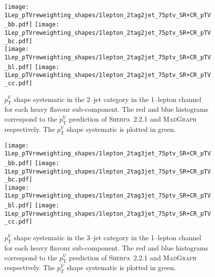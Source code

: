 \begin{figure}[ht!]
  \centering
  \texttt{[image: 1Lep\_pTVreweighting\_shapes/1lepton\_2tag2jet\_75ptv\_SR+CR\_pTV\_bb.pdf]}
  \texttt{[image: 1Lep\_pTVreweighting\_shapes/1lepton\_2tag2jet\_75ptv\_SR+CR\_pTV\_bc.pdf]}
  \\
  \texttt{[image: 1Lep\_pTVreweighting\_shapes/1lepton\_2tag2jet\_75ptv\_SR+CR\_pTV\_bl.pdf]}
  \texttt{[image: 1Lep\_pTVreweighting\_shapes/1lepton\_2tag2jet\_75ptv\_SR+CR\_pTV\_cc.pdf]}
  \\
  \caption[Derivation of $p_{\mathrm{T}}^V$ shape uncertainties on $W+$jets events in the
  1--lepton channel (2--jet category).]{$p_{\mathrm{T}}^V$ shape systematic in the 2--jet
    category in the 1--lepton channel for each heavy flavour sub-component. The
    red and blue histograms correspond to the $p_{\mathrm{T}}^V$ prediction of
    \textsc{Sherpa}~2.2.1 and \textsc{MadGraph} respectively. The $p_{\mathrm{T}}^V$ shape
    systematic is plotted in green.}
  \label{fig:wjets_1lep_2jet_SysWPtVBDTr}
\end{figure}

\begin{figure}[ht!]
  \centering
  \texttt{[image: 1Lep\_pTVreweighting\_shapes/1lepton\_2tag3jet\_75ptv\_SR+CR\_pTV\_bb.pdf]}
  \texttt{[image: 1Lep\_pTVreweighting\_shapes/1lepton\_2tag3jet\_75ptv\_SR+CR\_pTV\_bc.pdf]}
  \\
  \texttt{[image: 1Lep\_pTVreweighting\_shapes/1lepton\_2tag3jet\_75ptv\_SR+CR\_pTV\_bl.pdf]}
  \texttt{[image: 1Lep\_pTVreweighting\_shapes/1lepton\_2tag3jet\_75ptv\_SR+CR\_pTV\_cc.pdf]}
  \\
  \caption[Derivation of $p_{\mathrm{T}}^V$ shape uncertainties on $W+$jets events in the
  1--lepton channel (3--jet category).]{$p_{\mathrm{T}}^V$ shape systematic in the 3--jet
    category in the 1--lepton channel for each heavy flavour sub-component. The
    red and blue histograms correspond to the $p_{\mathrm{T}}^V$ prediction of
    \textsc{Sherpa}~2.2.1 and \textsc{MadGraph} respectively. The $p_{\mathrm{T}}^V$ shape
    systematic is plotted in green.}
  \label{fig:wjets_1lep_3jet_SysWPtVBDTr}
\end{figure}
